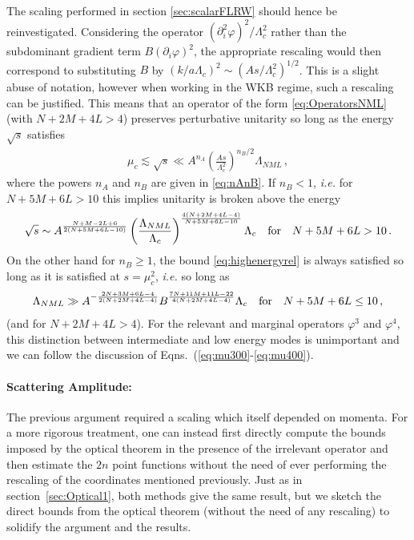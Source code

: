 \documentclass[12pt]{article}
\def\ba{\begin{eqnarray}}
\def\ea{\end{eqnarray}}
\def\({\left(}
\def\){\right)}
\def\ie{{\it i.e. }}
\def\p{\partial}
\def\p{\partial}
\begin{document}
The scaling performed in section \eqref{sec:scalarFLRW} should hence be reinvestigated. Considering the operator $(\p^2_i \varphi)^2/\Lambda_c^2$ rather than the subdominant gradient term $B (\p_i \varphi)^2$, the appropriate rescaling would then correspond to substituting $B$ by $(k/a \Lambda_c)^2\sim(A s/\Lambda_c^2)^{1/2}$. This is a slight abuse of notation, however when working in the WKB regime, such a rescaling can be justified.
This means that an operator of the form \eqref{eq:OperatorsNML} (with $N+2M+4L>4$) preserves perturbative unitarity so long as the energy $\sqrt{s}$ satisfies
\ba
\label{eq:highenergyrel}
\mu_c \lesssim \sqrt{s}\ll A^{n_A} \(\frac{A s}{\Lambda_c^2}\)^{n_B/2} \Lambda_{NML}\,,
\ea
where the powers $n_A$ and $n_B$ are given in \eqref{eq:nAnB}.
If $n_B < 1$, \ie for $N+5M+6L>10$ this implies unitarity is broken above the energy
\ba
\label{eq:strongMuhigh}
\sqrt{s} \sim A^{\frac{N+M-2L+6}{2(N+5M+6L-10)}}\(\frac{\Lambda_{NML}}{\Lambda_c}\)^{\frac{4(N+2M+4L-4)}{N+5M+6L-10}} \Lambda_c \quad{\rm for }\quad N+5M+6L>10\,.
\ea
On the other hand for $n_B\ge 1$, the bound \eqref{eq:highenergyrel} is always satisfied so long as it is satisfied at $s=\mu_c^2$, \ie so long as
\ba
\label{eq:LambdaNMLbound}
\Lambda_{NML}\gg A^{-\frac{2N+3M+6L-4}{2(N+2M+4L-4)}} B^{\frac{7N+11M+11L-22}{4(N+2M+4L-4)}} \Lambda_c\quad{\rm for }\quad N+5M+6L\le10 \,,
\ea
(and for $N+2M+4L>4$). For the relevant and marginal operators $\varphi^3$ and $\varphi^4$, this distinction between intermediate and low energy modes is unimportant and we can follow the discussion of Eqns.~(\ref{eq:mu300}-\ref{eq:mu400}).
\vspace{0.5cm}

\paragraph{Scattering Amplitude:} The previous argument required a scaling which itself depended on momenta. For a more rigorous treatment, one can instead first directly compute the bounds imposed by the optical theorem in the presence of the irrelevant operator and then estimate the $2n$  point functions without the need of ever performing the rescaling of the coordinates mentioned previously. Just as in section~\ref{sec:Optical1}, both methods give the same result, but we sketch the direct bounds from the optical theorem (without the need of any rescaling) to solidify the argument and the results.\\
\end{document}
